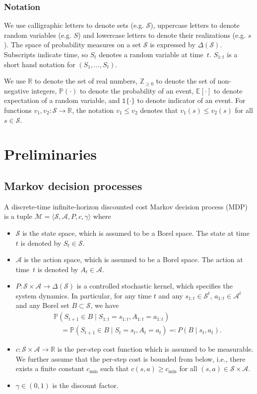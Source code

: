 \documentclass[letterpaper, 10pt]{IEEEtran}
\newcommand*\ALPHABET{\mathcal}
\newcommand*\PR{\mathds{P}}
\newcommand*\EXP{\mathds{E}}
\newcommand*\IND{\mathds{1}}
\newcommand*\reals{\mathds{R}}
\begin{document}
\subsubsection*{Notation}
We use calligraphic letters to denote sets (e.g. $\ALPHABET S$), uppercase letters to denote random variables (e.g. $S$) and lowercase letters to denote their realizations (e.g. $s$). The space of probability measures on a set $\ALPHABET S$ is expressed by $\Delta(\ALPHABET S)$. 
Subscripts indicate time, so $S_t$ denotes a random variable at time~$t$. $S_{1:t}$ is a short hand notation for $(S_1, \dots, S_t)$. 

We use $\reals$ to denote the set of real numbers, $\mathds{Z}_{\ge 0}$ to denote the set of non-negative integers, $\PR(\cdot)$ to denote the probability of an event, $\EXP[\cdot]$ to denote expectation of a random variable, and $\IND\{\cdot\}$ to denote indicator of an event. For functions $v_1, v_2 \colon \ALPHABET S \to \reals$, the notation $v_1 \le v_2$ denotes that $v_1(s) \le v_2(s)$ for all $s \in \ALPHABET S$. 

\section{Preliminaries}
\subsection{Markov decision processes}
A discrete-time infinite-horizon discounted cost Markov decision process (MDP) is a tuple $\ALPHABET M = \langle \ALPHABET S, \ALPHABET A, P, c, \gamma \rangle$ where
\begin{itemize}
  \item $\ALPHABET S$ is the state space, which is assumed to be a Borel
    space. The state at time $t$ is denoted by $S_t \in \ALPHABET S$. 
  \item $\ALPHABET A$ is the action space, which is assumed to be a Borel
    space. The action at time~$t$ is denoted by $A_t \in \ALPHABET
    A$. 
  \item $P \colon \ALPHABET S \times \ALPHABET A \to \Delta(\ALPHABET S)$ is a
    controlled stochastic kernel, which specifies the system dynamics. In
    particular, for any time $t$ and any $s_{1:t} \in \ALPHABET S^t$, $a_{1:t}
    \in \ALPHABET A^t$ and any Borel set $B \subset \ALPHABET S$, we have
    \begin{align*}
      &\PR(S_{t+1} \in B \mid S_{1:t} = s_{1:t}, A_{1:t} = a_{1:t})
      \\
      &\quad =
      \PR(S_{t+1} \in B \mid S_t = s_t, A_t = a_t)
      \eqqcolon
      P(B \mid s_t, a_t).
    \end{align*}
  \item $c \colon \ALPHABET S \times \ALPHABET A \to \reals$ is the
    per-step cost function which is assumed to be measurable. We further assume that the per-step cost is  bounded from below, i.e., there exists a finite constant $c_{\min}$ such that $c(s,a) \ge c_{\min}$ for all $(s,a) \in \ALPHABET S \times \ALPHABET A$. 
  \item $\gamma \in (0,1)$ is the discount factor.
\end{itemize}
\end{document}
